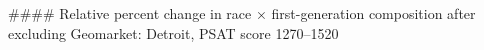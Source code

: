 #### Relative percent change in race × first-generation composition after excluding Geomarket: Detroit, PSAT score 1270–1520
